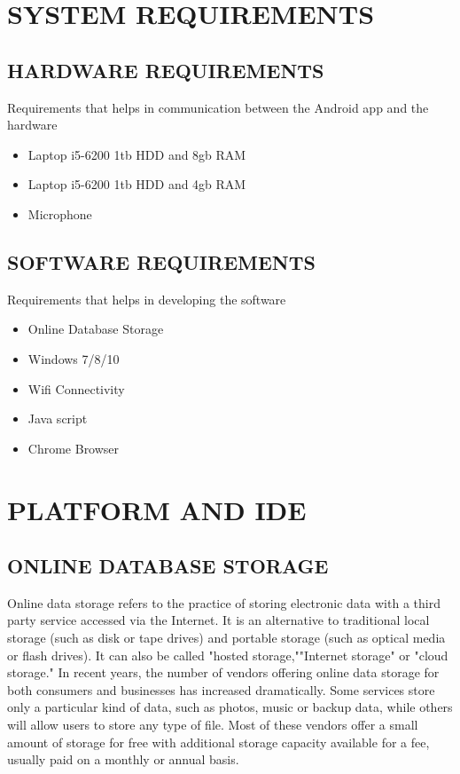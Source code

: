 \documentclass[12pt]{report} %
\begin{document}
\section{SYSTEM REQUIREMENTS}
\label{sec:SYSTEM REQUIREMENTS}


\subsection{HARDWARE REQUIREMENTS}
\label{subsec:HARDWARE REQUIREMENTS}
Requirements that helps in communication between the Android app and the hardware
\begin{itemize}
	\item Laptop i5-6200 1tb HDD and 8gb RAM
	\item Laptop i5-6200 1tb HDD and 4gb RAM
	\item Microphone
\end{itemize}

\subsection{SOFTWARE REQUIREMENTS}
\label{subsec:SOFTWARE REQUIREMENTS}
Requirements that helps in developing the software
\begin{itemize}
	\item Online Database Storage
	\item Windows 7/8/10
	\item Wifi Connectivity
	\item Java script
	\item Chrome Browser
\end{itemize}
\section{PLATFORM AND IDE}
\label{sec:PLATFORM AND IDE}


\subsection{ONLINE DATABASE STORAGE}
\label{subsec:ONLINE DATABASE STORAGE}
Online data storage refers to the practice of storing electronic data with a third party service accessed via the Internet. It is an alternative to traditional local storage (such as disk or tape drives) and portable storage (such as optical media or flash drives). It can also be called "hosted storage,""Internet storage" or "cloud storage."
In recent years, the number of vendors offering online data storage for both consumers and businesses has increased dramatically. Some services store only a particular kind of data, such as photos, music or backup data, while others will allow users to store any type of file. Most of these vendors offer a small amount of storage for free with additional storage capacity available for a fee, usually paid on a monthly or annual basis.
\end{document}
